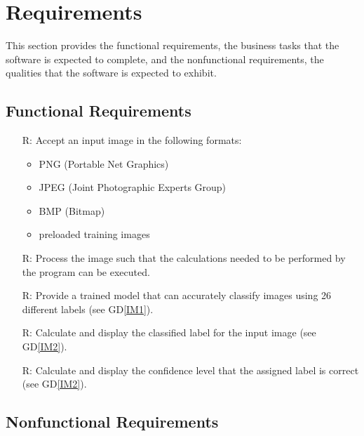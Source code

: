 \documentclass[12pt]{article}
\newcommand{\dref}[1]{GD\ref{#1}}
\newcounter{reqnum} %
\begin{document}
\section{Requirements}

This section provides the functional requirements, the business tasks that the
software is expected to complete, and the nonfunctional requirements, the
qualities that the software is expected to exhibit.

\subsection{Functional Requirements}

\noindent \begin{itemize}

\item[R\refstepcounter{reqnum}\thereqnum \label{R_Inputs}:] Accept an input image in the following formats: \begin{itemize}
  \item PNG (Portable Net Graphics)
  \item JPEG (Joint Photographic Experts Group)
  \item BMP (Bitmap)
  \item preloaded training images
\end{itemize}

\item[R\refstepcounter{reqnum}\thereqnum \label{R_OutputInputs}:] Process the image such that the calculations
needed to be performed by the program can be executed.

\item[R\refstepcounter{reqnum}\thereqnum \label{R_OutputInputs}:] Provide a trained model that can accurately classify images using
26 different labels (see \dref{IM1}).

\item[R\refstepcounter{reqnum}\thereqnum \label{R_Calculate}:] Calculate and display the classified label for the input image (see \dref{IM2}).

\item[R\refstepcounter{reqnum}\thereqnum \label{R_VerifyOutput}:] Calculate and display the confidence level that the assigned
label is correct (see \dref{IM2}).

\end{itemize}

\subsection{Nonfunctional Requirements}
\end{document}
